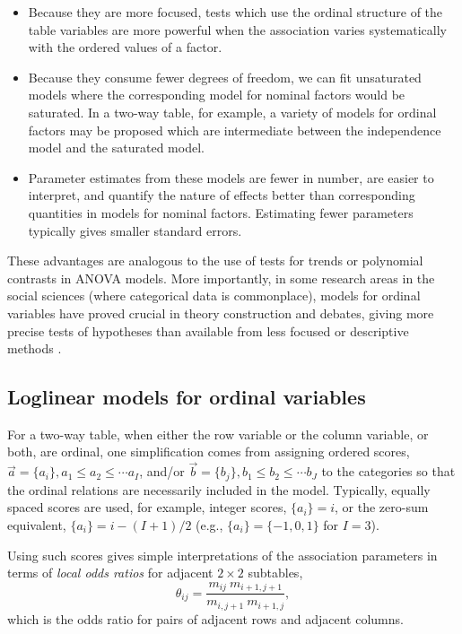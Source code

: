 \documentclass[11pt]{book}\usepackage[]{graphicx}\usepackage[]{color}
\begin{document}
\begin{itemize}
\item Because they are more focused, tests which use the ordinal
structure of the table variables are more powerful when the association
varies systematically with the ordered values of a factor.

\item Because they consume fewer degrees of freedom,
we can fit unsaturated models where the corresponding model for
nominal factors would be saturated.
In a two-way table, for example, a variety of models for ordinal
factors may be proposed which are intermediate between the independence
model and the saturated model.

\item Parameter estimates from these models are fewer in number, are
easier to interpret, and quantify the nature of effects better
than corresponding quantities in models for nominal factors.
Estimating fewer parameters typically gives smaller standard errors.
\end{itemize}
These advantages are analogous to the use of tests for trends or
polynomial contrasts in ANOVA models.
More importantly, in some research areas in the social sciences
(where categorical data is commonplace), models for
ordinal variables have proved crucial in theory construction
and debates, giving more precise tests of hypotheses than
available from less focused or descriptive methods
\citep{Agresti:84}.

\subsection{Loglinear models for ordinal variables}\label{sec:loglin-ordlog}
For a two-way table, when either the row variable or the column variable,
or both, are ordinal, one simplification comes from assigning ordered
scores, $\vec{a}=\{a_i\}, a_1 \le a_2 \le \cdots a_I$, and/or
$\vec{b}=\{b_j\}, b_1 \le b_2 \le \cdots b_J$
to the categories
so that the ordinal relations are necessarily included in the model.
Typically, equally spaced scores are used, for example, integer
scores, $\{a_i\}=i$, or the zero-sum equivalent, $\{a_i\}=i-(I+1)/2$
(e.g., $\{a_i\}= \{-1, 0, 1\}$ for $I=3$).

Using such scores gives simple interpretations of the
association parameters in terms of \emph{local odds ratios}
for adjacent $2 \times 2$ subtables,
\begin{equation}\label{eq:loddsratios}
 \theta_{ij} =
 \frac{ m_{ij} \: m_{i+1, j+1} } { m_{i,j+1} \: m_{i+1, j} }
 \comma
\end{equation}
which is the odds ratio for pairs of adjacent rows and adjacent columns.
\end{document}
